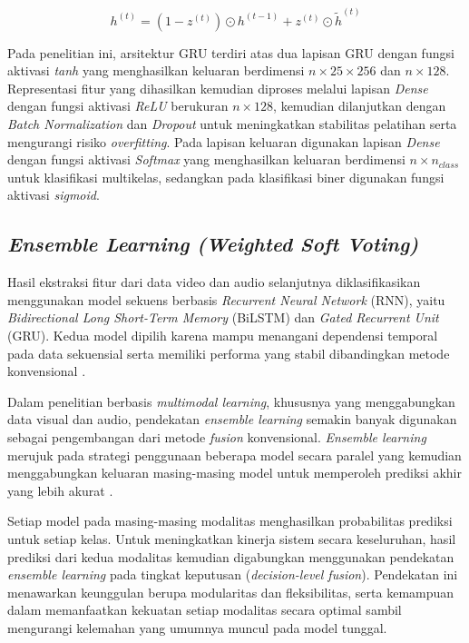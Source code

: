 \documentclass {rapidsart}
\theoremstyle{plain}
\theoremstyle{remark}
\theoremstyle{definition}
\begin{document}
\begin{equation}
h^{(t)}
=
\left(
1-z^{(t)}
\right)
\odot
h^{(t-1)}
+
z^{(t)}
\odot
\tilde{h}^{(t)}
\label{eq:gru_hidden}
\end{equation}

Pada penelitian ini, arsitektur GRU terdiri atas dua lapisan GRU dengan fungsi aktivasi \textit{tanh} yang menghasilkan keluaran berdimensi $n \times 25 \times 256$ dan $n \times 128$. Representasi fitur yang dihasilkan kemudian diproses melalui lapisan \textit{Dense} dengan fungsi aktivasi \textit{ReLU} berukuran $n \times 128$, kemudian dilanjutkan dengan \textit{Batch Normalization} dan \textit{Dropout} untuk meningkatkan stabilitas pelatihan serta mengurangi risiko \textit{overfitting}. Pada lapisan keluaran digunakan lapisan \textit{Dense} dengan fungsi aktivasi \textit{Softmax} yang menghasilkan keluaran berdimensi $n \times n_{class}$ untuk klasifikasi multikelas, sedangkan pada klasifikasi biner digunakan fungsi aktivasi \textit{sigmoid}.

\subsection{\textit{Ensemble Learning (Weighted Soft Voting)}}

Hasil ekstraksi fitur dari data video dan audio selanjutnya diklasifikasikan menggunakan model sekuens berbasis \textit{Recurrent Neural Network} (RNN), yaitu \textit{Bidirectional Long Short-Term Memory} (BiLSTM) dan \textit{Gated Recurrent Unit} (GRU). Kedua model dipilih karena mampu menangani dependensi temporal pada data sekuensial serta memiliki performa yang stabil dibandingkan metode konvensional \citep{Ahmadzadeh2022}.

Dalam penelitian berbasis \textit{multimodal learning}, khususnya yang menggabungkan data visual dan audio, pendekatan \textit{ensemble learning} semakin banyak digunakan sebagai pengembangan dari metode \textit{fusion} konvensional. \textit{Ensemble learning} merujuk pada strategi penggunaan beberapa model secara paralel yang kemudian menggabungkan keluaran masing-masing model untuk memperoleh prediksi akhir yang lebih akurat \citep{Li2021}.

Setiap model pada masing-masing modalitas menghasilkan probabilitas prediksi untuk setiap kelas. Untuk meningkatkan kinerja sistem secara keseluruhan, hasil prediksi dari kedua modalitas kemudian digabungkan menggunakan pendekatan \textit{ensemble learning} pada tingkat keputusan (\textit{decision-level fusion}). Pendekatan ini menawarkan keunggulan berupa modularitas dan fleksibilitas, serta kemampuan dalam memanfaatkan kekuatan setiap modalitas secara optimal sambil mengurangi kelemahan yang umumnya muncul pada model tunggal.
\end{document}
